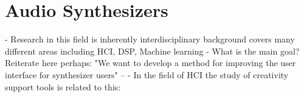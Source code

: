 
\chapter{Audio Synthesizers}
\label{chapter:background}
- Research in this field is inherently interdisciplinary background covers many different areas including HCI, DSP, Machine learning
- What is the main goal? Reiterate here perhaps: "We want to develop a method for improving the user interface for synthesizer users" -- 
- In the field of HCI the study of creativity support tools is related to this:




